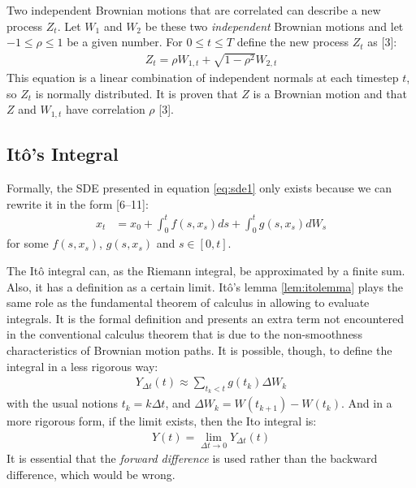 \documentclass[12pt,twoside]{reedthesis}
\theoremstyle{definition}
\theoremstyle{definition}
\theoremstyle{remark}
\begin{document}
  Two independent Brownian motions that are correlated can describe a new
  process \(Z_t\). Let \(W_1\) and \(W_2\) be these two \emph{independent}
  Brownian motions and let \(-1 \leq \rho \leq 1\) be a given number. For
  \(0 \leq t \leq T\) define the new process \(Z_t\) as {[}3{]}:
  \begin{align}
  \label{eq:corr_brow}
  Z_t = \rho W_{1,t} + \sqrt{1-\rho^2}W_{2,t}
  \end{align}
  \noindent
  This equation is a linear combination of independent normals at each
  timestep \(t\), so \(Z_t\) is normally distributed. It is proven that
  \(Z\) is a Brownian motion and that \(Z\) and \(W_{1,t}\) have
  correlation \(\rho\) {[}3{]}.
  
  \subsection{Itô's Integral}\label{itos-integral}
  
  Formally, the SDE presented in equation \eqref{eq:sde1} only exists
  because we can rewrite it in the form {[}6--11{]}:
  \begin{align} 
  \label{eq:sde2}
  x_t &= x_0 + \int_{0}^{t}{f(s, x_s)ds} + \int_{0}^{t}{g(s, x_s)dW_s}
  \end{align}
  \noindent
  for some \(f(s, x_s)\), \(g(s, x_s)\) and \(s \in [0,t]\).
  
  The Itô integral can, as the Riemann integral, be approximated by a
  finite sum. Also, it has a definition as a certain limit. Itô's lemma
  \ref{lem:itolemma} plays the same role as the fundamental theorem of
  calculus in allowing to evaluate integrals. It is the formal definition
  and presents an extra term not encountered in the conventional calculus
  theorem that is due to the non-smoothness characteristics of Brownian
  motion paths. It is possible, though, to define the integral in a less
  rigorous way:
  \begin{align}
  Y_{\Delta t}(t) \approx \sum_{t_k < t}{g(t_k)\Delta W_k}
  \end{align}
  \noindent
  with the usual notions \(t_k = k\Delta t\), and
  \(\Delta W_k = W(t_{k+1})-W(t_k)\). And in a more rigorous form, if the
  limit exists, then the Ito integral is:
  \begin{align}
  Y(t)  = \lim\limits_{\Delta t \to 0} Y_{\Delta t}(t)
  \end{align}
  It is essential that the \emph{forward difference} is used rather than
  the backward difference, which would be wrong.
  
\end{document}
